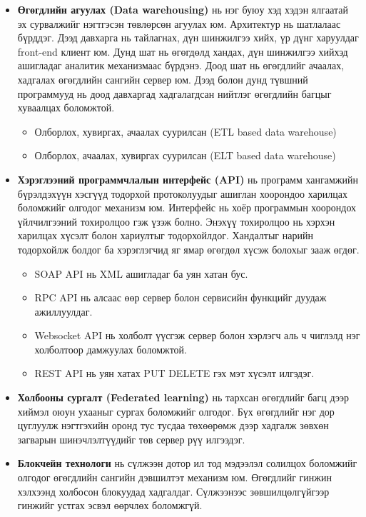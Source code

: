 \begin{itemize}
    \item \textbf{Өгөгдлийн агуулах (Data warehousing)} нь нэг буюу хэд хэдэн ялгаатай эх сурвалжийг нэгтгэсэн төвлөрсөн агуулах юм. Архитектур нь шатлалаас бүрддэг. Дээд давхарга нь тайлагнах, дүн шинжилгээ хийх, үр дүнг харуулдаг front-end клиент юм. Дунд шат нь өгөгдөлд хандах, дүн шинжилгээ хийхэд ашигладаг аналитик механизмаас бүрдэнэ. Доод шат нь өгөгдлийг ачаалах, хадгалах өгөгдлийн сангийн сервер юм. Дээд болон дунд түвшний программууд нь доод давхаргад хадгалагдсан нийтлэг өгөгдлийн багцыг хуваалцах боломжтой.
          \begin{itemize}
              \item Олборлох, хувиргах, ачаалах суурилсан (ETL based data warehouse)
              \item Олборлох, ачаалах, хувиргах суурилсан (ELT based data warehouse)
          \end{itemize}

    \item \textbf{Хэрэглээний программчлалын интерфейс (API)} нь программ хангамжийн бүрэлдэхүүн хэсгүүд тодорхой протоколуудыг ашиглан хоорондоо харилцах боломжийг олгодог механизм юм. Интерфейс нь хоёр программын хоорондох үйлчилгээний тохиролцоо гэж үзэж болно. Энэхүү тохиролцоо нь хэрхэн харилцах хүсэлт болон хариултыг тодорхойлдог. Хандалтыг нарийн тодорхойлж болдог ба хэрэглэгчид яг ямар өгөгдөл хүсэж болохыг зааж өгдөг.
          \begin{itemize}
              \item SOAP API нь XML ашигладаг ба уян хатан бус.
              \item RPC API нь алсаас өөр сервер болон сервисийн функцийг дуудаж ажиллуулдаг.
              \item Websocket API нь холболт үүсгэж сервер болон хэрлэгч аль ч чиглэлд нэг холболтоор дамжуулах боломжтой.
              \item REST API нь уян хатах PUT DELETE гэх мэт хүсэлт илгэдэг.
          \end{itemize}

    \item \textbf{Холбооны сургалт (Federated learning)} нь тархсан өгөгдлийг багц дээр хиймэл оюун ухааныг сургах боломжийг олгодог. Бүх өгөгдлийг нэг дор цуглуулж нэгтгэхийн оронд тус тусдаа төхөөрөмж дээр хадгалж зөвхөн загварын шинэчлэлтүүдийг төв сервер рүү илгээдэг.

    \item \textbf{Блокчейн технологи} нь сүлжээн дотор ил тод мэдээлэл солилцох боломжийг олгодог өгөгдлийн сангийн дэвшилтэт механизм юм. Өгөгдлийг гинжин хэлхээнд холбосон блокуудад хадгалдаг. Сүлжээнээс зөвшилцөлгүйгээр гинжийг устгах эсвэл өөрчлөх боломжгүй.


\end{itemize}
